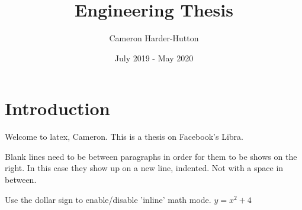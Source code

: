 \documentclass{article}
\title{Engineering Thesis}
\author{Cameron Harder-Hutton}
\date{July 2019 - May 2020}
\begin{document}
\maketitle

\section{Introduction}

Welcome to latex, Cameron. This is a thesis on Facebook's Libra.


Blank lines need to be between paragraphs in order for them to be shows on the 
right. In this case they show up on a new line, indented. Not with a space in 
between.


Use the dollar sign to enable/disable 'inline' math mode.
$y = x^2 + 4$
\end{document}
